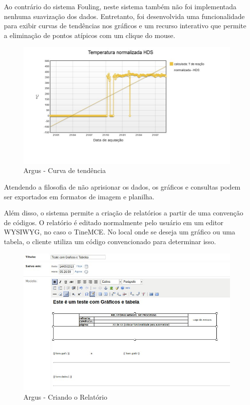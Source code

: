 \documentclass[]{article}
\begin{document}
Ao contrário do sistema Fouling, neste sistema também não foi implementada nenhuma suavização dos dados. Entretanto, foi desenvolvida uma funcionalidade para exibir curvas de tendências nos gráficos e um recurso interativo que permite a eliminação de pontos atípicos com um clique do mouse.

\begin{figure}[!ht]
\centering
\includegraphics[scale=.4]{./argus_curva_tendencia}
\caption{Argus - Curva de tendência}
\label{fig:argus_curva_tendencia}
\end{figure}

Atendendo a filosofia de não aprisionar os dados, os gráficos e consultas podem ser exportados em formatos de imagem e planilha.

Além disso, o sistema permite a criação de relatórios a partir de uma convenção de códigos. O relatório é editado normalmente pelo usuário em um editor WYSIWYG, no caso o TineMCE. \cite{tinemce:Online} No local onde se deseja um gráfico ou uma tabela, o cliente utiliza um código convencionado para determinar isso.

\begin{figure}[!ht]
\centering
\includegraphics[scale=.5]{./argus_criando_relatorio}
\caption{Argus - Criando o Relatório}
\label{fig:argus_criando_relatorio}
\end{figure}
\end{document}
